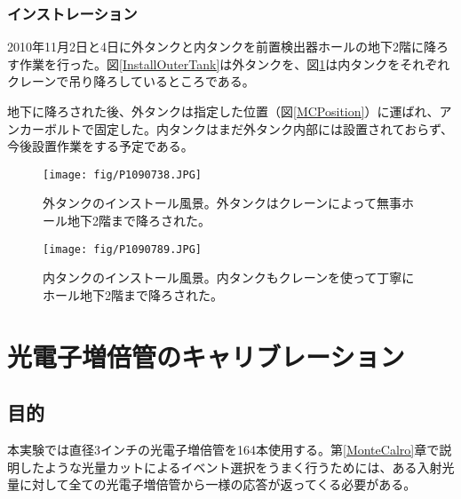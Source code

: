 \documentclass[11pt]{ltjsreport}
\newcommand{\figref}[1]{図\ref{#1}}
\newcommand{\secref}[1]{第\ref{#1}章}
\begin{document}
\subsection{インストレーション}
2010年11月2日と4日に外タンクと内タンクを前置検出器ホールの地下2階に降ろす作業を行った。\figref{InstallOuterTank}は外タンクを、\figref{InstallInnerTank}は内タンクをそれぞれクレーンで吊り降ろしているところである。

地下に降ろされた後、外タンクは指定した位置（\figref{MCPosition}）に運ばれ、アンカーボルトで固定した。内タンクはまだ外タンク内部には設置されておらず、今後設置作業をする予定である。

\begin{figure}[htbp]
\begin{minipage}{0.47\textwidth}
\centering
\texttt{[image: fig/P1090738.JPG]}
\caption[外タンクインストール風景]{外タンクのインストール風景。外タンクはクレーンによって無事ホール地下2階まで降ろされた。}
\label{InstallOuterTank}
\end{minipage}
\hfil
\begin{minipage}{0.47\textwidth}
\centering
\texttt{[image: fig/P1090789.JPG]}
\caption[内タンクインストール風景]{内タンクのインストール風景。内タンクもクレーンを使って丁寧にホール地下2階まで降ろされた。}
\label{InstallInnerTank}
\end{minipage}
\end{figure}








\chapter{光電子増倍管のキャリブレーション}
\label{PMTCalibration}
\section{目的}
本実験では直径3インチの光電子増倍管を164本使用する。\secref{MonteCalro}で説明したような光量カットによるイベント選択をうまく行うためには、ある入射光量に対して全ての光電子増倍管から一様の応答が返ってくる必要がある。
\end{document}
